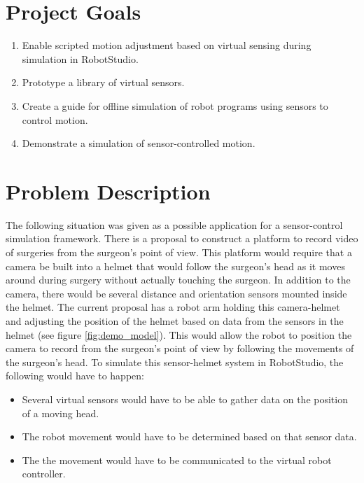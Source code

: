 \documentclass{cslthse-msc}
\begin{document}
\section{Project Goals}
\label{sec:Intro:Proj_Goals}
\begin{enumerate}
    \item Enable scripted motion adjustment based on virtual sensing during simulation in RobotStudio.
    \item Prototype a library of virtual sensors.
    \item Create a guide for offline simulation of robot programs using sensors to control motion.
    \item Demonstrate a simulation of sensor-controlled motion. 
\end{enumerate}


\section{Problem Description}
\label{sec:Intro:Prob_Description}
The following situation was given as a possible application for a sensor-control simulation framework. There is a proposal to construct a platform to record video of surgeries from the surgeon's point of view. This platform would require that a camera be built into a helmet that would follow the surgeon's head as it moves around during surgery without actually touching the surgeon. In addition to the camera, there would be several distance and orientation sensors mounted inside the helmet. The current proposal has a robot arm holding this camera-helmet and adjusting the position of the helmet based on data from the sensors in the helmet (see figure \ref{fig:demo_model}). This would allow the robot to position the camera to record from the surgeon's point of view by following the movements of the surgeon's head. To simulate this sensor-helmet system in RobotStudio, the following would have to happen:
\begin{itemize}
    \item Several virtual sensors would have to be able to gather data on the position of a moving head.
    \item The robot movement would have to be determined based on that sensor data.
    \item The the movement would have to be communicated to the virtual robot controller. 
\end{itemize}
\end{document}
